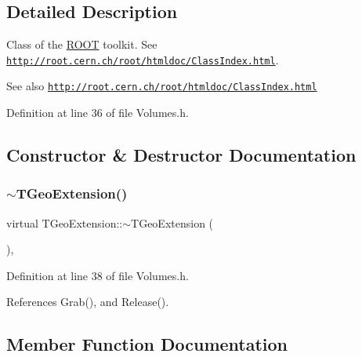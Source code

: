 \subsection{Detailed Description}
Class of the \hyperlink{namespace_r_o_o_t}{R\+O\+OT} toolkit. See \href{http://root.cern.ch/root/htmldoc/ClassIndex.html}{\tt http\+://root.\+cern.\+ch/root/htmldoc/\+Class\+Index.\+html}. 

\begin{DoxySeeAlso}{See also}
\href{http://root.cern.ch/root/htmldoc/ClassIndex.html}{\tt http\+://root.\+cern.\+ch/root/htmldoc/\+Class\+Index.\+html} 
\end{DoxySeeAlso}


Definition at line 36 of file Volumes.\+h.



\subsection{Constructor \& Destructor Documentation}
\hypertarget{class_t_geo_extension_a07855c18b6678a4f6f4f125b85727fa1}{}\label{class_t_geo_extension_a07855c18b6678a4f6f4f125b85727fa1} 
\subsubsection{\texorpdfstring{$\sim$\+T\+Geo\+Extension()}{~TGeoExtension()}}
{\footnotesize\ttfamily virtual T\+Geo\+Extension\+::$\sim$\+T\+Geo\+Extension (\begin{DoxyParamCaption}{ }\end{DoxyParamCaption})\hspace{0.3cm}{\ttfamily [inline]}, {\ttfamily [virtual]}}



Definition at line 38 of file Volumes.\+h.



References Grab(), and Release().



\subsection{Member Function Documentation}
\hypertarget{class_t_geo_extension_addd8a323d93527519b94e2db3acbf9d5}{}\label{class_t_geo_extension_addd8a323d93527519b94e2db3acbf9d5} 

